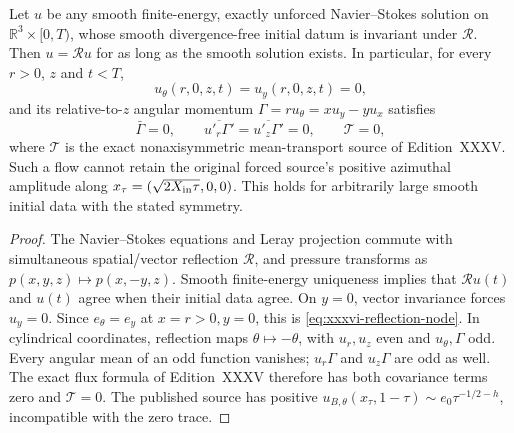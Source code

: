 \begin{theorem}
\label{thm:xxxvi-reflection}
Let $u$ be any smooth finite-energy, exactly unforced
Navier--Stokes solution on $\mathbb R^3\times[0,T)$,
whose smooth divergence-free initial datum is invariant
under $\mathscr R$. Then $u=\mathscr Ru$ for as long as
the smooth solution exists. In particular, for every $r>0$,
$z$ and $t<T$,
\begin{equation}\label{eq:xxxvi-reflection-node}
\boxed{\quad u_\theta(r,0,z,t)=u_y(r,0,z,t)=0,\quad}
\end{equation}
and its relative-to-$z$ angular momentum
$\Gamma=ru_\theta=xu_y-yu_x$ satisfies
\[
\boxed{\quad
\bar\Gamma=0,\qquad
\overline{u'_r\Gamma'}=\overline{u'_z\Gamma'}=0,
\qquad \mathcal T=0,\quad}
\]
where $\mathcal T$ is the exact nonaxisymmetric
mean-transport source of Edition~XXXV.
Such a flow cannot retain the original forced
source's positive azimuthal amplitude along
$x_\tau=(\sqrt{2X_{\rm in}\tau},0,0)$.
This holds for arbitrarily large smooth initial data
with the stated symmetry.
\end{theorem}
\begin{proof}
The Navier--Stokes equations and Leray projection
commute with simultaneous spatial/vector reflection
$\mathscr R$, and pressure transforms as
$p(x,y,z)\mapsto p(x,-y,z)$.
Smooth finite-energy uniqueness implies that
$\mathscr Ru(t)$ and $u(t)$ agree when their initial
data agree. On $y=0$, vector invariance forces $u_y=0$.
Since $e_\theta=e_y$ at $x=r>0,y=0$, this is
\eqref{eq:xxxvi-reflection-node}.
In cylindrical coordinates, reflection maps
$\theta\mapsto-\theta$, with $u_r,u_z$ even
and $u_\theta,\Gamma$ odd.
Every angular mean of an odd function vanishes;
$u_r\Gamma$ and $u_z\Gamma$ are odd as well.
The exact flux formula of Edition~XXXV therefore
has both covariance terms zero and $\mathcal T=0$.
The published source has positive
$u_{B,\theta}(x_\tau,1-\tau)\sim
e_0\tau^{-1/2-h}$, incompatible with the zero trace.
\end{proof}

